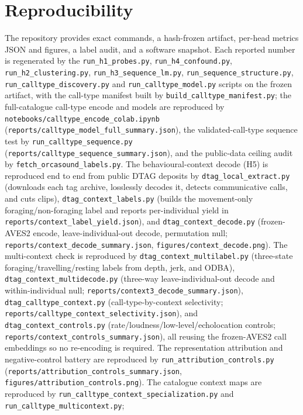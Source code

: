 \documentclass[11pt]{article}
\begin{document}
\section{Reproducibility}
The repository provides exact commands, a hash-frozen artifact, per-head metrics JSON and
figures, a label audit, and a software snapshot. Each reported number is regenerated by the
\texttt{run\_h1\_probes.py}, \texttt{run\_h4\_confound.py}, \texttt{run\_h2\_clustering.py},
\texttt{run\_h3\_sequence\_lm.py}, \texttt{run\_sequence\_structure.py},
\texttt{run\_calltype\_discovery.py} and \texttt{run\_calltype\_model.py} scripts on the frozen
artifact, with the call-type manifest built by \texttt{build\_calltype\_manifest.py}; the
full-catalogue call-type encode and models are reproduced by
\texttt{notebooks/calltype\_encode\_colab.ipynb} (\texttt{reports/calltype\_model\_full\_summary.json}),
the validated-call-type sequence test by \texttt{run\_calltype\_sequence.py}
(\texttt{reports/calltype\_sequence\_summary.json}), and the public-data ceiling audit by
\texttt{fetch\_orcasound\_labels.py}. The behavioural-context decode (H5) is reproduced end to
end from public DTAG deposits by \texttt{dtag\_local\_extract.py} (downloads each tag archive,
losslessly decodes it, detects communicative calls, and cuts clips),
\texttt{dtag\_context\_labels.py} (builds the movement-only foraging/non-foraging label and
reports per-individual yield in \texttt{reports/context\_label\_yield.json}), and
\texttt{dtag\_context\_decode.py} (frozen-AVES2 encode, leave-individual-out decode,
permutation null; \texttt{reports/context\_decode\_summary.json},
\texttt{figures/context\_decode.png}). The multi-context check is reproduced by
\texttt{dtag\_context\_multilabel.py} (three-state foraging/travelling/resting labels from
depth, jerk, and ODBA), \texttt{dtag\_context\_multidecode.py} (three-way leave-individual-out
decode and within-individual null; \texttt{reports/context3\_decode\_summary.json}),
\texttt{dtag\_calltype\_context.py} (call-type-by-context selectivity;
\texttt{reports/calltype\_context\_selectivity.json}), and \texttt{dtag\_context\_controls.py}
(rate/loudness/low-level/echolocation controls; \texttt{reports/context\_controls\_summary.json}),
all reusing the frozen-AVES2 call embeddings so no re-encoding is required. The
representation attribution and negative-control battery are reproduced by
\texttt{run\_attribution\_controls.py} (\texttt{reports/attribution\_controls\_summary.json},
\texttt{figures/attribution\_controls.png}). The catalogue context maps are reproduced by
\texttt{run\_calltype\_context\_specialization.py} and \texttt{run\_calltype\_multicontext.py};
\end{document}

